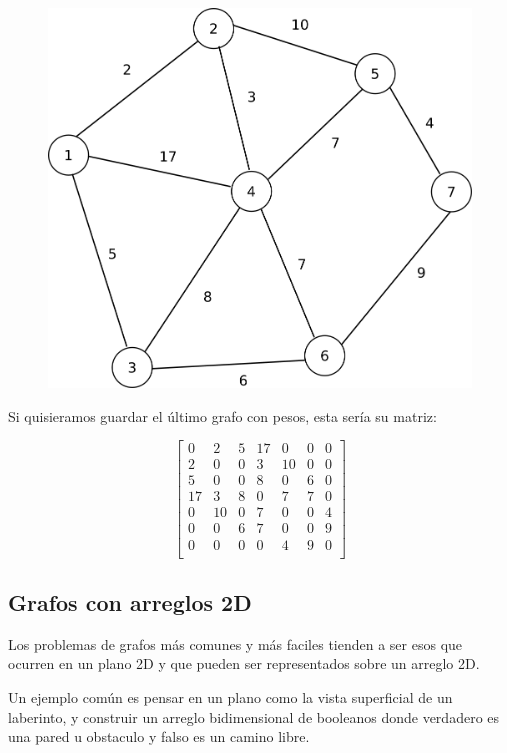 \documentclass{article}
\begin{document}
\begin{figure}[H]
    \centering
    \includegraphics[width=0.32\paperwidth]{dijkstra}
\end{figure}

Si quisieramos guardar el último grafo con pesos, esta sería su matriz:

$$
\begin{bmatrix}
0 & 2 & 5 & 17 & 0 & 0 & 0 \\
2 & 0 & 0 & 3 & 10 & 0 & 0 \\
5 & 0 & 0 & 8 & 0 & 6 & 0 \\
17 & 3 & 8 & 0 & 7 & 7 & 0 \\
0 & 10 & 0 & 7 & 0 & 0 & 4 \\
0 & 0 & 6 & 7 & 0 & 0 & 9 \\
0 & 0 & 0 & 0 & 4 & 9 & 0 \\
\end{bmatrix}
$$

\subsection{Grafos con arreglos 2D}

Los problemas de grafos más comunes y más faciles tienden a ser esos que ocurren en un plano 2D y que pueden ser representados sobre un arreglo 2D.

Un ejemplo común es pensar en un plano como la vista superficial de un laberinto, y construir un arreglo bidimensional de booleanos donde verdadero es una pared u obstaculo y falso es un camino libre.
\end{document}

